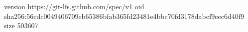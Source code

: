 version https://git-lfs.github.com/spec/v1
oid sha256:56cdc0049406709eb65386bfab365fd23481e4bbc70fd3178dabcf9eec6d40f9
size 503607
